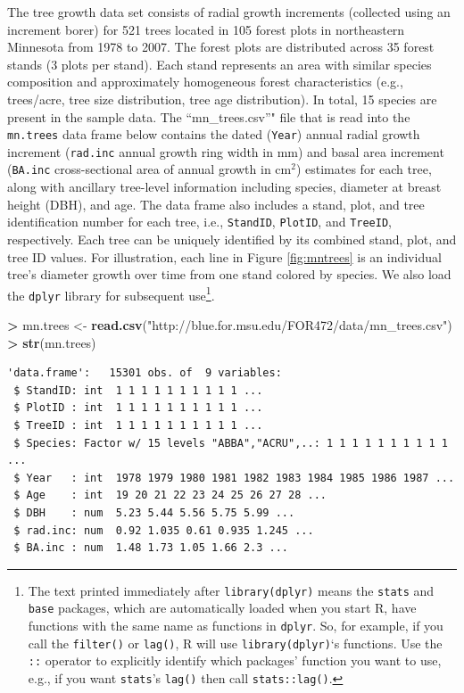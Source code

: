 \documentclass[]{krantz}
\makeatletter
\newenvironment{Shaded}{\begin{snugshade}}{\end{snugshade}}
\newcommand{\KeywordTok}[1]{\textcolor[rgb]{0.27,0.27,0.27}{\textbf{#1}}}
\newcommand{\StringTok}[1]{\textcolor[rgb]{0.5,0.5,0.5}{#1}}
\newcommand{\OperatorTok}[1]{\textcolor[rgb]{0.43,0.43,0.43}{\textbf{#1}}}
\newcommand{\NormalTok}[1]{#1}
\newenvironment{kframe}{%
\medskip{}
\setlength{\fboxsep}{.8em}
 \def\at@end@of@kframe{}%
 \ifinner\ifhmode%
  \def\at@end@of@kframe{\end{minipage}}%
  \begin{minipage}{\columnwidth}%
 \fi\fi%
 \def\FrameCommand##1{\hskip\@totalleftmargin \hskip-\fboxsep
 \colorbox{shadecolor}{##1}\hskip-\fboxsep
     \hskip-\linewidth \hskip-\@totalleftmargin \hskip\columnwidth}%
 \MakeFramed {\advance\hsize-\width
   \@totalleftmargin\z@ \linewidth\hsize
   \@setminipage}}%
 {\par\unskip\endMakeFramed%
 \at@end@of@kframe}
\renewenvironment{Shaded}{\begin{kframe}}{\end{kframe}}
\theoremstyle{definition}
\theoremstyle{definition}
\theoremstyle{definition}
\theoremstyle{remark}
\makeatother
\begin{document}
The tree growth data set consists of radial growth increments (collected
using an increment borer) for 521 trees located in 105 forest plots in
northeastern Minnesota from 1978 to 2007. The forest plots are
distributed across 35 forest stands (3 plots per stand). Each stand
represents an area with similar species composition and approximately
homogeneous forest characteristics (e.g., trees/acre, tree size
distribution, tree age distribution). In total, 15 species are present
in the sample data. The ``mn\_trees.csv''" file that is read into the
\texttt{mn.trees} data frame below contains the dated (\texttt{Year})
annual radial growth increment (\texttt{rad.inc} annual growth ring
width in mm) and basal area increment (\texttt{BA.inc} cross-sectional
area of annual growth in cm\(^2\)) estimates for each tree, along with
ancillary tree-level information including species, diameter at breast
height (DBH), and age. The data frame also includes a stand, plot, and
tree identification number for each tree, i.e., \texttt{StandID},
\texttt{PlotID}, and \texttt{TreeID}, respectively. Each tree can be
uniquely identified by its combined stand, plot, and tree ID values. For
illustration, each line in Figure \ref{fig:mntrees} is an individual
tree's diameter growth over time from one stand colored by species. We
also load the \texttt{dplyr} library for subsequent use\footnote{The
  text printed immediately after \texttt{library(dplyr)} means the
  \texttt{stats} and \texttt{base} packages, which are automatically
  loaded when you start R, have functions with the same name as
  functions in \texttt{dplyr}. So, for example, if you call the
  \texttt{filter()} or \texttt{lag()}, R will use
  \texttt{library(dplyr)}`s functions. Use the \texttt{::} operator to
  explicitly identify which packages' function you want to use, e.g., if
  you want \texttt{stats}'s \texttt{lag()} then call
  \texttt{stats::lag()}.}.

\begin{Shaded}
\begin{Highlighting}[]
\OperatorTok{>}\StringTok{ }\NormalTok{mn.trees <-}\StringTok{ }\KeywordTok{read.csv}\NormalTok{(}\StringTok{"http://blue.for.msu.edu/FOR472/data/mn_trees.csv"}\NormalTok{)}
\OperatorTok{>}\StringTok{ }\KeywordTok{str}\NormalTok{(mn.trees)}
\end{Highlighting}
\end{Shaded}

\begin{verbatim}
'data.frame':   15301 obs. of  9 variables:
 $ StandID: int  1 1 1 1 1 1 1 1 1 1 ...
 $ PlotID : int  1 1 1 1 1 1 1 1 1 1 ...
 $ TreeID : int  1 1 1 1 1 1 1 1 1 1 ...
 $ Species: Factor w/ 15 levels "ABBA","ACRU",..: 1 1 1 1 1 1 1 1 1 1 ...
 $ Year   : int  1978 1979 1980 1981 1982 1983 1984 1985 1986 1987 ...
 $ Age    : int  19 20 21 22 23 24 25 26 27 28 ...
 $ DBH    : num  5.23 5.44 5.56 5.75 5.99 ...
 $ rad.inc: num  0.92 1.035 0.61 0.935 1.245 ...
 $ BA.inc : num  1.48 1.73 1.05 1.66 2.3 ...
\end{verbatim}
\end{document}
